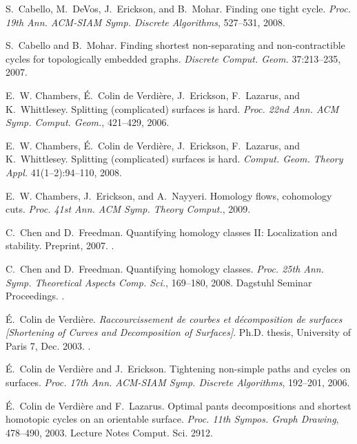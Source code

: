 \begin{thebibliography}{10}
S.~Cabello, M.~DeVos, J.~Erickson, and B.~Mohar.
\newblock Finding one tight cycle.
\newblock \emph{Proc. 19th Ann. ACM-SIAM Symp. Discrete Algorithms}, 527--531,
  2008.

S.~Cabello and B.~Mohar.
\newblock Finding shortest non-separating and non-contractible cycles for
  topologically embedded graphs.
\newblock \emph{Discrete Comput. Geom.} 37:213--235, 2007.

E.~W. Chambers, {\'E}.~{Colin de Verdi\`{e}re}, J.~Erickson, F.~Lazarus, and
  K.~Whittlesey.
\newblock Splitting (complicated) surfaces is hard.
\newblock \emph{Proc. 22nd Ann. ACM Symp. Comput. Geom.}, 421--429, 2006.

E.~W. Chambers, {\'E}.~{Colin de Verdi{\`e}re}, J.~Erickson, F.~Lazarus, and
  K.~Whittlesey.
\newblock Splitting (complicated) surfaces is hard.
\newblock \emph{Comput. Geom. Theory Appl.} 41(1--2):94--110, 2008.

E.~W. Chambers, J.~Erickson, and A.~Nayyeri.
\newblock Homology flows, cohomology cuts.
\newblock \emph{Proc. 41st Ann. ACM Symp. Theory Comput.}, 2009.

C.~Chen and D.~Freedman.
\newblock Quantifying homology classes {II}: {L}ocalization and stability.
\newblock Preprint, 2007.
\newblock {}.

C.~Chen and D.~Freedman.
\newblock Quantifying homology classes.
\newblock \emph{Proc. 25th Ann. Symp. Theoretical Aspects Comp. Sci.},
  169--180, 2008. Dagstuhl Seminar Proceedings.
\newblock {}.

{\'E}.~{Colin de Verdi{\`e}re}.
\newblock \emph{Raccourcissement de courbes et d{\'e}composition de surfaces
  [Shortening of Curves and Decomposition of Surfaces]}.
\newblock Ph.D. thesis, University of Paris 7, Dec. 2003.
\newblock {}.

{\'E}.~{Colin de Verdi{\`e}re} and J.~Erickson.
\newblock Tightening non-simple paths and cycles on surfaces.
\newblock \emph{Proc. 17th Ann. ACM-SIAM Symp. Discrete Algorithms}, 192--201,
  2006.

{\'E}.~{Colin de Verdi{\`e}re} and F.~Lazarus.
\newblock Optimal pants decompositions and shortest homotopic cycles on an
  orientable surface.
\newblock \emph{Proc. 11th Sympos. Graph Drawing}, 478--490, 2003. Lecture
  Notes Comput. Sci. 2912.


\end{thebibliography}
